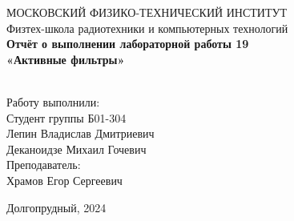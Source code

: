 \begin{center}
    МОСКОВСКИЙ ФИЗИКО-ТЕХНИЧЕСКИЙ ИНСТИТУТ \\
    
    \hfill \break
    Физтех-школа радиотехники и компьютерных технологий\\
    \vspace{5cm}
    \large{\textbf{Отчёт о выполнении лабораторной работы 19 \\ «Активные фильтры»}}\\
    \hfill \break
    \\
    \end{center}
    
    \vspace{5cm}
     
    \begin{flushright}
    Работу выполнили:\\
    Студент группы Б01-304\\
    Лепин Владислав Дмитриевич\\
    Деканоидзе Михаил Гочевич\\
    Преподаватель:\\
    Храмов Егор Сергеевич\\
    \end{flushright}
     
    \vfill
    
    
    \begin{center} Долгопрудный, 2024 \end{center}
    
    \thispagestyle{empty}
    \newpage